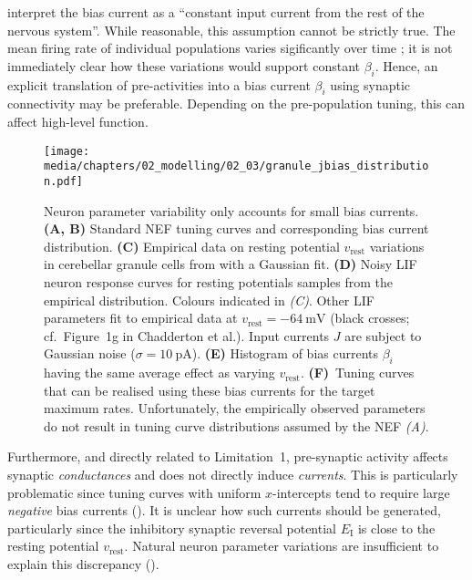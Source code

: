 interpret the bias current as a \enquote{constant input current from the rest of the nervous system}.
While reasonable, this assumption cannot be strictly true.
The mean firing rate of individual populations varies sigificantly over time \citep{okun2012population}; it is not immediately clear how these variations would support constant $\beta_i$.
Hence, an explicit translation of pre-activities into a bias current $\beta_i$ using synaptic connectivity may be preferable.
Depending on the pre-population tuning, this can affect high-level function.


\begin{figure}
	\texttt{[image: media/chapters/02\_modelling/02\_03/granule\_jbias\_distribution.pdf]}%
	{\label{fig:jbias_a}}%
	{\label{fig:jbias_b}}%
	{\label{fig:jbias_c}}%
	{\label{fig:jbias_d}}%
	{\label{fig:jbias_e}}%
	{\label{fig:jbias_f}}
	\caption[Neuron parameter variability only accounts for small bias currents]{Neuron parameter variability only accounts for small bias currents.
	\textbf{(A, B)} Standard NEF tuning curves and corresponding bias current distribution.
	\textbf{(C)} Empirical data on resting potential $v_\mathrm{rest}$ variations in cerebellar granule cells from \citet[Figure~1b]{chadderton2004integration} with a Gaussian fit.
	\textbf{(D)} Noisy LIF neuron response curves for resting potentials samples from the empirical distribution. Colours indicated in \emph{(C)}. Other LIF parameters fit to empirical data at $v_\mathrm{rest} = \SI{-64}{\milli\volt}$ (black crosses; cf.~Figure~1g in Chadderton et al.). Input currents $J$ are subject to Gaussian noise ($\sigma = \SI{10}{\pico\ampere}$). \textbf{(E)} Histogram of bias currents $\beta_i$ having the same average effect as varying $v_\mathrm{rest}$.
	\textbf{(F)}~Tuning curves that can be realised using these bias currents for the target maximum rates.
	Unfortunately, the empirically observed parameters do not result in tuning curve distributions assumed by the NEF \emph{(A)}.}
	\label{fig:granule_jbias_distribution}
	\vspace*{-0.5em}
\end{figure}

Furthermore, and directly related to Limitation~1, pre-synaptic activity affects synaptic \emph{conductances} and does not directly induce \emph{currents}.
This is particularly problematic since tuning curves with uniform $x$-intercepts tend to require large \emph{negative} bias currents ().
It is unclear how such currents should be generated, particularly since the inhibitory synaptic reversal potential $E_\mathrm{I}$ is close to the resting potential $v_\mathrm{rest}$.
Natural neuron parameter variations are insufficient to explain this discrepancy ().

